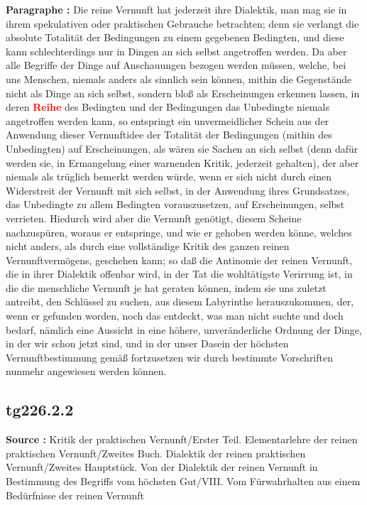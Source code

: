 \documentclass[a4paper,12pt,twoside]{book}
\newcommand{\match}[1]{\textcolor{red}{\textbf{#1}}}
\begin{document}
	\noindent\textbf{Paragraphe : }Die reine Vernunft hat jederzeit ihre Dialektik, man mag sie in ihrem spekulativen oder praktischen Gebrauche betrachten; denn sie verlangt die absolute Totalität der Bedingungen zu einem gegebenen Bedingten, und diese kann schlechterdings nur in Dingen an sich selbst angetroffen werden. Da aber alle Begriffe der Dinge auf Anschauungen bezogen werden müssen, welche, bei uns Menschen, niemals anders als sinnlich sein können, mithin die Gegenstände nicht als Dinge an sich selbst, sondern bloß als Erscheinungen erkennen lassen, in deren \match{Reihe} des Bedingten und der Bedingungen das Unbedingte niemals angetroffen werden kann, so entspringt ein unvermeidlicher Schein aus der Anwendung dieser Vernunftidee der Totalität der Bedingungen  (mithin des Unbedingten) auf Erscheinungen, als wären sie Sachen an sich selbst (denn dafür werden sie, in Ermangelung einer warnenden Kritik, jederzeit gehalten), der aber niemals als trüglich bemerkt werden würde, wenn er sich nicht durch einen Widerstreit der Vernunft mit sich selbst, in der Anwendung ihres Grundsatzes, das Unbedingte zu allem Bedingten vorauszusetzen, auf Erscheinungen, selbst verrieten. Hiedurch wird aber die Vernunft genötigt, diesem Scheine nachzuspüren, woraus er entspringe, und wie er gehoben werden könne, welches nicht anders, als durch eine vollständige Kritik des ganzen reinen Vernunftvermögens, geschehen kann; so daß die Antinomie der reinen Vernunft, die in ihrer Dialektik offenbar wird, in der Tat die wohltätigste Verirrung ist, in die die menschliche Vernunft je hat geraten können, indem sie uns zuletzt antreibt, den Schlüssel zu suchen, aus diesem Labyrinthe herauszukommen, der, wenn er gefunden worden, noch das entdeckt, was man nicht suchte und doch bedarf, nämlich eine Aussicht in eine höhere, unveränderliche Ordnung der Dinge, in der wir schon jetzt sind, und in der unser Dasein der höchsten Vernunftbestimmung gemäß fortzusetzen wir durch bestimmte Vorschriften nunmehr angewiesen werden können. 
	
	\subsection*{tg226.2.2} 
	\textbf{Source : }Kritik der praktischen Vernunft/Erster Teil. Elementarlehre der reinen praktischen Vernunft/Zweites Buch. Dialektik der reinen praktischen Vernunft/Zweites Hauptstück. Von der Dialektik der reinen Vernunft in Bestimmung des Begriffs vom höchsten Gut/VIII. Vom Fürwahrhalten aus einem Bedürfnisse der reinen Vernunft\\  
	
\end{document}
